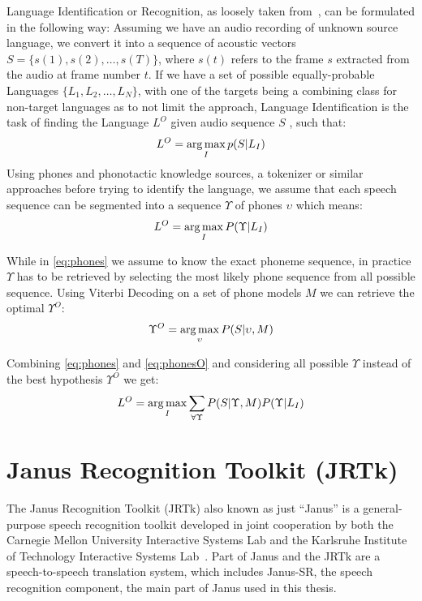 Language Identification or Recognition, as loosely taken from~\cite{6451097}, can be formulated in the following way: Assuming we have an audio recording of unknown source language, we convert it into a sequence of acoustic vectors \(S = \{ s(1), s(2), \dots , s(T)\}\), where \(s(t)\) refers to the frame \(s\) extracted from the audio at frame number \(t\). If we have a set of possible equally-probable Languages \(\{L_1,L_2,\dots,L_N\}\), with one of the targets being a combining class for non-target languages as to not limit the approach, Language Identification is the task of finding the Language \(L^O\) given audio sequence \(S\) , such that:
\begin{equation}
L^O = \operatorname*{arg\,max}_I p(S|L_I)
\end{equation}
Using phones and phonotactic knowledge sources, a tokenizer or similar approaches before trying to identify the language, we assume that each speech sequence can be segmented into a sequence \(\Upsilon\) of phones \(\upsilon\) which means:
\begin{equation}
\label{eq:phones}
L^O = \operatorname*{arg\,max}_I P(\Upsilon|L_I)
\end{equation}

While in \ref{eq:phones} we assume to know the exact phoneme sequence, in practice \(\Upsilon\) has to be retrieved by selecting the most likely phone sequence from all possible sequence. Using Viterbi Decoding on a set of phone models \(M\) we can retrieve the optimal \(\Upsilon^O\):
\begin{equation}
\label{eq:phonesO}
\Upsilon^O = \operatorname*{arg\,max}_{\upsilon} P(S|\upsilon, M)
\end{equation} 

Combining \ref{eq:phones} and \ref{eq:phonesO} and considering all possible \(\Upsilon\) instead of the best hypothesis \(\Upsilon^O\) we get:
\begin{equation}
L^O = \operatorname*{arg\,max}_{I}\sum_{\forall \Upsilon}P(S|\Upsilon, M)P(\Upsilon|L_I)
\end{equation}

\section{Janus Recognition Toolkit (JRTk)}
\label{sec:fund:JRTk}
The Janus Recognition Toolkit (JRTk) also known as just ``Janus'' is a general-purpose speech recognition toolkit developed in joint cooperation by both the Carnegie Mellon University Interactive Systems Lab and the Karlsruhe Institute of Technology Interactive Systems Lab~\cite{lavie1997Janus}. Part of Janus and the JRTk are a speech-to-speech translation system, which includes Janus-SR, the speech recognition component, the main part of Janus used in this thesis. 


